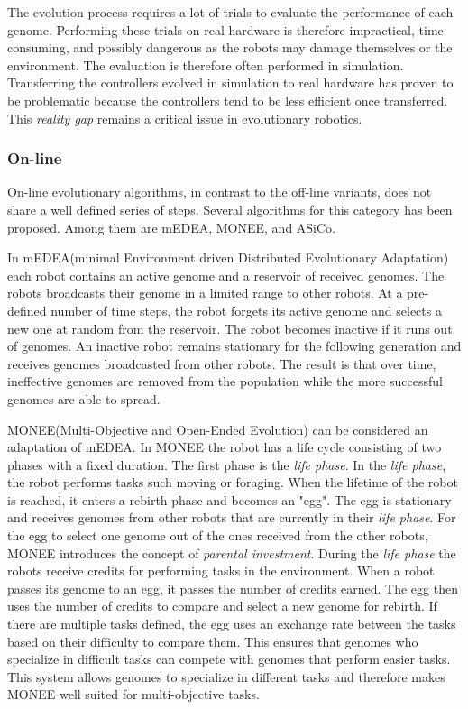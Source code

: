 The evolution process requires a lot of trials to evaluate the performance of each genome. Performing these trials on real hardware is therefore impractical, time consuming, and possibly dangerous as the robots may damage themselves or the environment.
The evaluation is therefore often performed in simulation\cite{koos_crossing_2010}.
Transferring the controllers evolved in simulation to real hardware has proven to be problematic because the controllers tend to be less efficient once transferred.
This \emph{reality gap} remains a critical issue in evolutionary robotics\cite{koos_crossing_2010}.



\subsubsection*{On-line}
On-line evolutionary algorithms, in contrast to the off-line variants, does not share a well defined series of steps. Several algorithms for this category has been proposed. Among them are mEDEA\cite{montanier_adaptive_2014}, MONEE\cite{noskov_monee:_2013}, and ASiCo\cite{hutchison_task-driven_2011}. 

In mEDEA(minimal Environment driven Distributed Evolutionary Adaptation) each robot contains an active genome and a reservoir of received genomes.
The robots broadcasts their genome in a limited range to other robots.
At a pre-defined number of time steps, the robot forgets its active genome and selects a new one at random from the reservoir.
The robot becomes inactive if it runs out of genomes.
An inactive robot remains stationary for the following generation and receives genomes broadcasted from other robots.
The result is that over time, ineffective genomes are removed from the population while the more successful genomes are able to spread.

MONEE(Multi-Objective and Open-Ended Evolution) can be considered an adaptation of mEDEA.
In MONEE the robot has a life cycle consisting of two phases with a fixed duration.
The first phase is the \emph{life phase}.
In the \emph{life phase}, the robot performs tasks such moving or foraging.
When the lifetime of the robot is reached, it enters a rebirth phase and becomes an "egg".
The egg is stationary and receives genomes from other robots that are currently in their \emph{life phase}.
For the egg to select one genome out of the ones received from the other robots, MONEE introduces the concept of \emph{parental investment}.
During the \emph{life phase} the robots receive credits for performing tasks in the environment.
When a robot passes its genome to an egg, it passes the number of credits earned.
The egg then uses the number of credits to compare and select a new genome for rebirth.
If there are multiple tasks defined, the egg uses an exchange rate between the tasks based on their difficulty to compare them. 
This ensures that genomes who specialize in difficult tasks can compete with genomes that perform easier tasks. 
This system allows genomes to specialize in different tasks and therefore makes MONEE well suited for multi-objective tasks.

